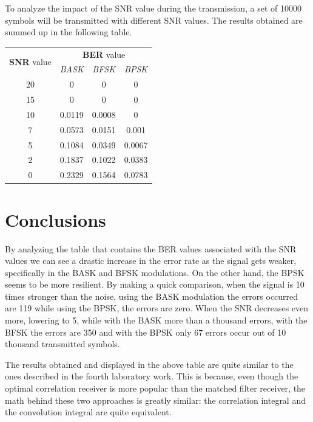 \noindent To analyze the impact of the SNR value during the transmission, a set of 10000 symbols will be transmitted with different SNR values. The results obtained are summed up in the following table.
\begin{table}[h!]
    \centering
    \renewcommand{\arraystretch}{1.5}
    \begin{tabular}{|c|c c c|}
        \hline
        \multirow{2}{*}{\textbf{SNR} value} &  \multicolumn{3}{c|}{\textbf{BER} value} \\
        & \textsl{BASK} & \textsl{BFSK} & \textsl{BPSK} \\\hline\hline
        20 & 0 & 0 & 0 \\
        15 & 0 & 0 & 0 \\
        10 & 0.0119 & 0.0008 & 0 \\
        7 & 0.0573 & 0.0151 & 0.001 \\
        5 & 0.1084 & 0.0349 & 0.0067 \\
        2 & 0.1837 & 0.1022 & 0.0383 \\
        0 & 0.2329 & 0.1564 & 0.0783 \\\hline
    \end{tabular}
    \renewcommand{\arraystretch}{1}
\end{table}


\FloatBarrier\section*{Conclusions}
By analyzing the table that contains the BER values associated with the SNR values we can see a drastic increase in the error rate as the signal gets weaker, specifically in the BASK and BFSK modulations. On the other hand, the BPSK seems to be more resilient. By making a quick comparison, when the signal is 10 times stronger than the noise, using the BASK modulation the errors occurred are 119 while using the BPSK, the errors are zero. When the SNR decreases even more, lowering to 5, while with the BASK more than a thousand errors, with the BFSK the errors are 350 and with the BPSK only 67 errors occur out of 10 thousand transmitted symbols.

The results obtained and displayed in the above table are quite similar to the ones described in the fourth laboratory work. This is because, even though the optimal correlation receiver is more popular than the matched filter receiver, the math behind these two approaches is greatly similar: the correlation integral and the convolution integral are quite equivalent.

